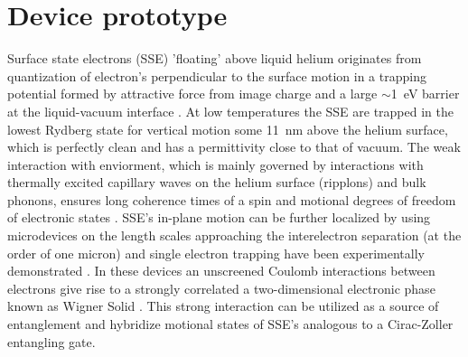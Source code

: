\documentclass[twocolumn,superscriptaddress,unsortedaddress,
 amsmath,amssymb,
 aps,
]{revtex4-2}
\begin{document}
\section{Device prototype}\label{sec:device} %
Surface state electrons (SSE) 'floating' above liquid helium originates from quantization of electron's perpendicular to the surface motion in a trapping potential formed by attractive force from image charge and a large $\sim$1~eV barrier at the liquid-vacuum interface \cite{cole1969,shikin1971}. At low temperatures the SSE are trapped in the lowest Rydberg state for vertical motion some 11~nm above the helium surface, which is perfectly clean and has a permittivity close to that of vacuum. The weak interaction with enviorment, which is mainly governed by interactions with thermally excited capillary waves on the helium surface (ripplons) and bulk phonons, ensures long coherence times of a spin and motional degrees of freedom of electronic states \cite{dykman2003qubits,lyon2006spin}. SSE's in-plane motion can be further localized by using microdevices on the length scales approaching the interelectron separation (at the order of one micron) \cite{rees2011point,rees2016structural} and single electron trapping have been experimentally demonstrated \cite{Papageorgiou2005Counting,koolstra2019coupling,zhou2022single}. In these devices an unscreened Coulomb interactions between electrons give rise to a strongly correlated a two-dimensional electronic phase known as Wigner Solid \cite{rees2016structural,grimes1979evidence}. This strong interaction can be utilized as a source of entanglement and hybridize motional states of SSE's analogous to a Cirac-Zoller entangling gate.
\end{document}
